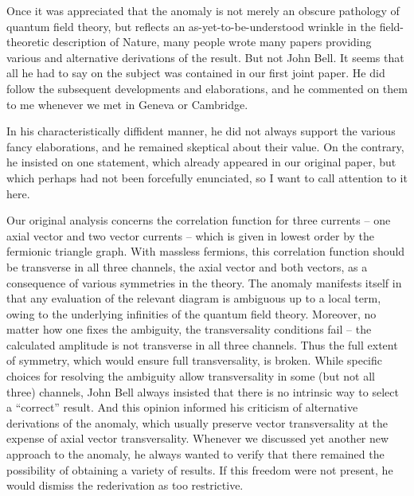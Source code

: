 \documentclass[a4paper,12pt,twoside]{article}
\begin{document}
Once it was appreciated that the anomaly is not merely an obscure pathology of
quantum field theory, but reflects an as-yet-to-be-understood wrinkle in the
field-theoretic description of Nature, many people wrote many papers providing
various and alternative derivations of the result. But not John Bell. It seems that all
he had to say on the subject was contained in our first joint paper. He did  follow
the subsequent developments and elaborations, and he commented on them to me
whenever we met in Geneva or Cambridge. 

In his characteristically diffident manner, he did not always support the various
fancy elaborations, and he remained skeptical about their value. On the contrary, he
insisted on one statement, which already appeared in our original paper, but which
perhaps had not been forcefully enunciated, so I want to call attention to it here. 

Our original analysis concerns the correlation function for three currents -- one axial
vector and two vector currents -- which is given in lowest order by the fermionic
triangle graph. With massless fermions, this correlation function should be
transverse in all three channels, the axial vector and both vectors, as a consequence
of various symmetries in the theory. The anomaly  manifests itself  in that any
evaluation of the relevant diagram is ambiguous up to a local term, owing to the
underlying infinities of the quantum field theory. Moreover, no matter how one fixes
the ambiguity, the transversality conditions fail -- the calculated amplitude is not
transverse in all three channels. Thus the full extent of symmetry, which would
ensure full transversality, is broken. While specific choices for resolving the
ambiguity allow transversality in some (but not all three) channels, John Bell always
insisted that there is no intrinsic way to select a ``correct'' result. And this opinion
informed his criticism of alternative derivations of the anomaly, which usually
preserve vector transversality at the expense of axial vector transversality.
Whenever we discussed yet another new approach to the anomaly, he always wanted
to verify that there remained the possibility of obtaining a variety of results. If this
freedom were not present, he would dismiss the rederivation as too restrictive. 
\end{document}

